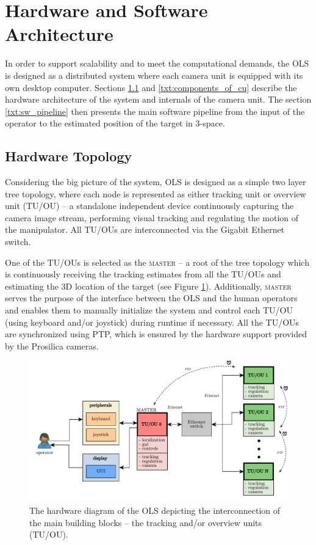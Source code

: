 \section{Hardware and Software Architecture}

In order to support scalability and to meet the computational demands, the OLS is designed as a distributed system where each camera unit is equipped with its own desktop computer. Sections \ref{txt:hardware_topology} and \ref{txt:components_of_cu} describe the hardware architecture of the system and internals of the camera unit. The section \ref{txt:sw_pipeline} then presents the main software pipeline from the input of the operator to the estimated position of the target in 3-space.

\subsection{Hardware Topology} \label{txt:hardware_topology}

Considering the big picture of the system, OLS is designed as a simple two layer tree topology, where each node is represented as either tracking unit or overview unit (TU/OU) -- a standalone independent device continuously capturing the camera image stream, performing visual tracking and regulating the motion of the manipulator. All TU/OUs are interconnected via the Gigabit Ethernet switch. 

One of the TU/OUs is selected as the \textsc{master} -- a root of the tree topology which is continuously receiving the tracking estimates from all the TU/OUs and estimating the 3D location of the target (see Figure \ref{fig:hw_ols}). Additionally, \textsc{master} serves the purpose of the interface between the OLS and the human operators and enables them to manually initialize the system and control each TU/OU (using keyboard and/or joystick) during runtime if necessary. All the TU/OUs are synchronized using PTP, which is ensured by the hardware support provided by the Prosilica cameras.


\begin{figure}[htb]
	\centering
	\includegraphics[width=0.9\linewidth]{fig/hwsw_architecture.pdf}
	\caption{The hardware diagram of the OLS depicting the interconnection of the main building blocks -- the tracking and/or overview units (TU/OU).}
	\label{fig:hw_ols}
\end{figure}

